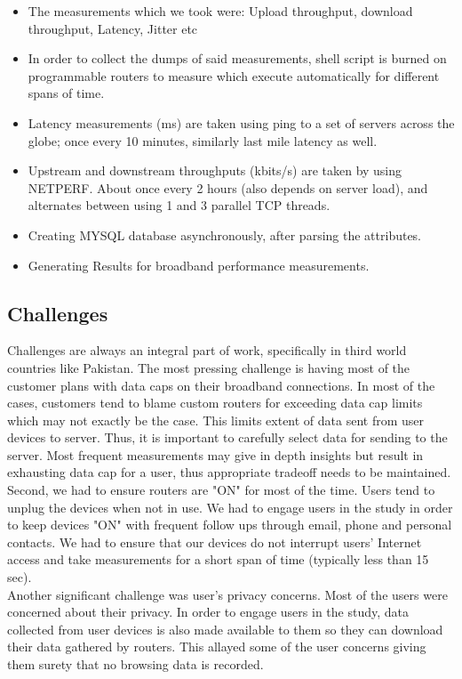\documentclass{sig-alternate-10pt}
\begin{document}
\begin{sloppypar}
\begin{itemize}
  \item The measurements which we took were: Upload throughput, download throughput, Latency, Jitter etc
  \item In order to collect the dumps of said measurements, shell script is burned on programmable routers to measure which execute automatically for different spans of time.
  \item Latency measurements (ms) are taken using ping to a set of servers across the globe; once every 10 minutes, similarly last mile latency as well. 
  \item Upstream and downstream throughputs (kbits/s) are taken by using NETPERF. About once every 2 hours (also depends on server load), and alternates between using 1 and 3 parallel TCP threads.
  \item Creating MYSQL database asynchronously, after parsing the attributes.
  \item Generating Results for broadband performance measurements.
\end{itemize}


\subsection{Challenges}
Challenges are always an integral part of work, specifically in third world countries like Pakistan. The most pressing challenge is having most of the customer plans with data caps on their broadband connections. In most of the cases, customers tend to blame custom routers for exceeding data cap limits which may not exactly be the case. This limits extent of data sent from user devices to server. Thus, it is important to carefully select data for sending to the server. Most frequent measurements may give in depth insights but result in exhausting data cap for a user, thus appropriate tradeoff needs to be maintained.\\
\indent	 Second, we had to ensure routers are "ON" for most of the time. Users tend to unplug the devices when not in use. We had to engage users in the study in order to keep devices "ON" with frequent follow ups through email, phone and personal contacts. We had to ensure that our devices do not interrupt users' Internet access and take measurements for a short span of time (typically less than 15 sec).\\
\indent Another significant challenge was user's privacy concerns. Most of the users were concerned about their privacy. In order to engage users in the study, data collected from user devices is also made available to them so they can download their data gathered by routers. This allayed some of the user concerns giving them surety that no browsing data is recorded.


\end{sloppypar}
\end{document}
